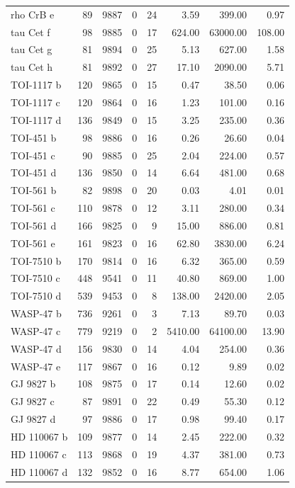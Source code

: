 \begin{table}
\begin{tabular}{lrrrrrrr}
rho CrB e & 89 & 9887 & 0 & 24 & 3.59 & 399.00 & 0.97 \\
tau Cet f & 98 & 9885 & 0 & 17 & 624.00 & 63000.00 & 108.00 \\
tau Cet g & 81 & 9894 & 0 & 25 & 5.13 & 627.00 & 1.58 \\
tau Cet h & 81 & 9892 & 0 & 27 & 17.10 & 2090.00 & 5.71 \\
TOI-1117 b & 120 & 9865 & 0 & 15 & 0.47 & 38.50 & 0.06 \\
TOI-1117 c & 120 & 9864 & 0 & 16 & 1.23 & 101.00 & 0.16 \\
TOI-1117 d & 136 & 9849 & 0 & 15 & 3.25 & 235.00 & 0.36 \\
TOI-451 b & 98 & 9886 & 0 & 16 & 0.26 & 26.60 & 0.04 \\
TOI-451 c & 90 & 9885 & 0 & 25 & 2.04 & 224.00 & 0.57 \\
TOI-451 d & 136 & 9850 & 0 & 14 & 6.64 & 481.00 & 0.68 \\
TOI-561 b & 82 & 9898 & 0 & 20 & 0.03 & 4.01 & 0.01 \\
TOI-561 c & 110 & 9878 & 0 & 12 & 3.11 & 280.00 & 0.34 \\
TOI-561 d & 166 & 9825 & 0 & 9 & 15.00 & 886.00 & 0.81 \\
TOI-561 e & 161 & 9823 & 0 & 16 & 62.80 & 3830.00 & 6.24 \\
TOI-7510 b & 170 & 9814 & 0 & 16 & 6.32 & 365.00 & 0.59 \\
TOI-7510 c & 448 & 9541 & 0 & 11 & 40.80 & 869.00 & 1.00 \\
TOI-7510 d & 539 & 9453 & 0 & 8 & 138.00 & 2420.00 & 2.05 \\
WASP-47 b & 736 & 9261 & 0 & 3 & 7.13 & 89.70 & 0.03 \\
WASP-47 c & 779 & 9219 & 0 & 2 & 5410.00 & 64100.00 & 13.90 \\
WASP-47 d & 156 & 9830 & 0 & 14 & 4.04 & 254.00 & 0.36 \\
WASP-47 e & 117 & 9867 & 0 & 16 & 0.12 & 9.89 & 0.02 \\
GJ 9827 b & 108 & 9875 & 0 & 17 & 0.14 & 12.60 & 0.02 \\
GJ 9827 c & 87 & 9891 & 0 & 22 & 0.49 & 55.30 & 0.12 \\
GJ 9827 d & 97 & 9886 & 0 & 17 & 0.98 & 99.40 & 0.17 \\
HD 110067 b & 109 & 9877 & 0 & 14 & 2.45 & 222.00 & 0.32 \\
HD 110067 c & 113 & 9868 & 0 & 19 & 4.37 & 381.00 & 0.73 \\
HD 110067 d & 132 & 9852 & 0 & 16 & 8.77 & 654.00 & 1.06 \\

\end{tabular}
\end{table}
